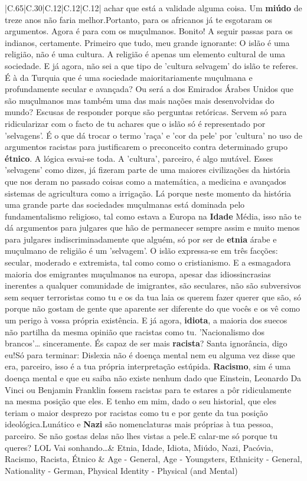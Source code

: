 \documentclass[11pt]{article}
\newlength\mylength
\begin{document}
\begin{center}
\begin{longtable}{|C{.65\mylength}|C{.30\mylength}|C{.12\mylength}|C{.12\mylength}|C{.12\mylength}|}
achar que está a validade alguma coisa. Um \textbf{miúdo} de treze anos não faria melhor.Portanto, para os africanos já te esgotaram os argumentos. Agora é para com os muçulmanos. Bonito! A seguir passas para os indianos, certamente. Primeiro que tudo, meu grande ignorante: O islão é uma religião, não é uma cultura. A religião é apenas um elemento cultural de uma sociedade. E já agora, não sei a que tipo de 'cultura selvagem' do islão te referes. É à da Turquia que é uma sociedade maioritariamente muçulmana e profundamente secular e avançada? Ou será a dos Emirados Árabes Unidos que são muçulmanos mas também uma das mais nações mais desenvolvidas do mundo? Escusas de responder porque são perguntas retóricas. Servem só para ridicularizar com o facto de tu achares que o islão só é representado por 'selvagens'. É o que dá trocar o termo 'raça' e 'cor da pele' por 'cultura' no uso de argumentos racistas para justificarem o preconceito contra determinado grupo \textbf{étnico}. A lógica esvai-se toda. A 'cultura', parceiro, é algo mutável. Esses 'selvagens' como dizes, já fizeram parte de uma maiores civilizações da história que nos deram no passado coisas como a matemática, a medicina e avançados sistemas de agricultura como a irrigação. Lá porque neste momento da história uma grande parte das sociedades muçulmanas está dominada pelo fundamentalismo religioso, tal como estava a Europa na \textbf{Idade} Média, isso não te dá argumentos para julgares que hão de permanecer sempre assim e muito menos para julgares indiscriminadamente que alguém, só por ser de \textbf{etnia} árabe e muçulmano de religião é um 'selvagem'. O islão expressa-se em três facções: secular, moderado e extremista, tal como como o cristianismo. E a esmagadora maioria dos emigrantes muçulmanos na europa, apesar das idiossincrasias inerentes a qualquer comunidade de imigrantes, são seculares, não são subversivos sem sequer terroristas como tu e os da tua laia os querem fazer querer que são, só porque não gostam de gente que aparente ser diferente do que vocês e os vê como um perigo à vossa própria existência. E já agora, \textbf{idiota}, a maioria dos suecos não partilha da mesma opinião que racistas como tu. 'Nacionalismo dos brancos'… sinceramente. És capaz de ser mais \textbf{racista}? Santa ignorância, digo eu!Só para terminar: Dislexia não é doença mental nem eu alguma vez disse que era, parceiro, isso é a tua própria interpretação estúpida. \textbf{Racismo}, sim é uma doença mental e que eu saiba não existe nenhum dado que Einstein, Leonardo Da Vinci ou Benjamin Franklin fossem racistas para te estares a pôr ridiculamente na mesma posição que eles. E tenho em mim, dado o seu historial, que eles teriam o maior desprezo por racistas como tu e por gente da tua posição ideológica.Lunático e \textbf{Nazi} são nomenclaturas mais próprias à tua pessoa, parceiro. Se não gostas delas não lhes vistas a pele.E calar-me só porque tu queres? LOL Vai sonhando…\normalsize   & Etnia, Idade, Idiota, Miúdo, Nazi, Pacóvia, Racismo, Racista, Étnico & Age - General, Age - Youngsters, Ethnicity - General, Nationality - German, Physical Identity - Physical (and Mental) 
\end{longtable}
\end{center}
\end{document}
